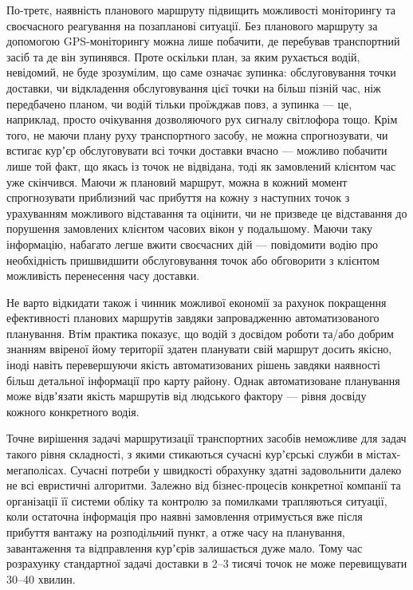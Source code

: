 По-третє, наявність планового маршруту підвищить можливості моніторингу та своєчасного реагування на позапланові ситуації. Без планового маршруту за допомогою GPS-моніторингу можна лише побачити, де перебував транспортний засіб та де він зупинявся. Проте оскільки план, за яким рухається водій, невідомий, не буде зрозумілим, що саме означає зупинка: обслуговування точки доставки, чи відкладення обслуговування цієї точки на більш пізній час, ніж передбачено планом, чи водій тільки проїжджав повз, а зупинка --- це, наприклад, просто очікування дозволяючого рух сигналу світлофора тощо. Крім того, не маючи плану руху транспортного засобу, не можна спрогнозувати, чи встигає курʼєр обслуговувати всі точки доставки вчасно --- можливо побачити лише той факт, що якась із точок не відвідана, тоді як замовлений клієнтом час уже скінчився. Маючи ж плановий маршрут, можна в кожний момент спрогнозувати приблизний час прибуття на кожну з наступних точок з урахуванням можливого відставання та оцінити, чи не призведе це відставання до порушення замовлених клієнтом часових вікон у подальшому. Маючи таку інформацію, набагато легше вжити своєчасних дій --- повідомити водію про необхідність пришвидшити обслуговування точок або обговорити з клієнтом можливість перенесення часу доставки.

Не варто відкидати також і чинник можливої економії за рахунок покращення ефективності планових маршрутів завдяки запровадженню автоматизованого планування. Втім практика показує, що водій з досвідом роботи та/або добрим знанням ввіреної йому території здатен планувати свій маршрут досить якісно, іноді навіть перевершуючи якість автоматизованих рішень завдяки наявності більш детальної інформації про карту району. Однак автоматизоване планування може відвʼязати якість маршрутів від людського фактору --- рівня досвіду кожного конкретного водія.

Точне вирішення задачі маршрутизації транспортних засобів неможливе для задач такого рівня складності, з якими стикаються сучасні курʼєрські служби в містах-мегаполісах. Сучасні потреби у швидкості обрахунку здатні задовольнити далеко не всі евристичні алгоритми. Залежно від бізнес-процесів конкретної компанії та організації її системи обліку та контролю за помилками трапляються ситуації, коли остаточна інформація про наявні замовлення отримується вже після прибуття вантажу на розподільчий пункт, а отже часу на планування, завантаження та відправлення курʼєрів залишається дуже мало. Тому час розрахунку стандартної задачі доставки в 2--3 тисячі точок не може перевищувати 30--40 хвилин.

